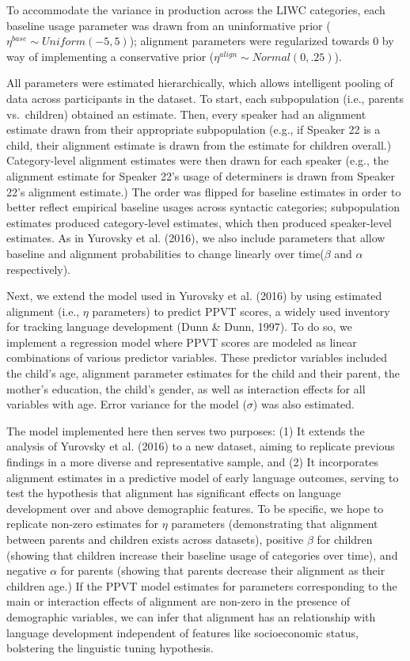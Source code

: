\documentclass[10pt, letterpaper]{article}
\begin{document}
To accommodate the variance in production across the LIWC categories,
each baseline usage parameter was drawn from an uninformative prior
(\(\eta^{base} \sim Uniform(-5,5)\)); alignment parameters were
regularized towards 0 by way of implementing a conservative prior
(\(\eta^{align} \sim Normal(0,.25)\)).

All parameters were estimated hierarchically, which allows intelligent
pooling of data across participants in the dataset. To start, each
subpopulation (i.e., parents vs.~children) obtained an estimate. Then,
every speaker had an alignment estimate drawn from their appropriate
subpopulation (e.g., if Speaker 22 is a child, their alignment estimate
is drawn from the estimate for children overall.) Category-level
alignment estimates were then drawn for each speaker (e.g., the
alignment estimate for Speaker 22's usage of determiners is drawn from
Speaker 22's alignment estimate.) The order was flipped for baseline
estimates in order to better reflect empirical baseline usages across
syntactic categories; subpopulation estimates produced category-level
estimates, which then produced speaker-level estimates. As in Yurovsky
et al. (2016), we also include parameters that allow baseline and
alignment probabilities to change linearly over time(\(\beta\) and
\(\alpha\) respectively).

Next, we extend the model used in Yurovsky et al. (2016) by using
estimated alignment (i.e., \(\eta\) parameters) to predict PPVT scores,
a widely used inventory for tracking language development (Dunn \& Dunn,
1997). To do so, we implement a regression model where PPVT scores are
modeled as linear combinations of various predictor variables. These
predictor variables included the child's age, alignment parameter
estimates for the child and their parent, the mother's education, the
child's gender, as well as interaction effects for all variables with
age. Error variance for the model (\(\sigma\)) was also estimated.

The model implemented here then serves two purposes: (1) It extends the
analysis of Yurovsky et al. (2016) to a new dataset, aiming to replicate
previous findings in a more diverse and representative sample, and (2)
It incorporates alignment estimates in a predictive model of early
language outcomes, serving to test the hypothesis that alignment has
significant effects on language development over and above demographic
features. To be specific, we hope to replicate non-zero estimates for
\(\eta\) parameters (demonstrating that alignment between parents and
children exists across datasets), positive \(\beta\) for children
(showing that children increase their baseline usage of categories over
time), and negative \(\alpha\) for parents (showing that parents
decrease their alignment as their children age.) If the PPVT model
estimates for parameters corresponding to the main or interaction
effects of alignment are non-zero in the presence of demographic
variables, we can infer that alignment has an relationship with language
development independent of features like socioeconomic status,
bolstering the linguistic tuning hypothesis.
\end{document}
